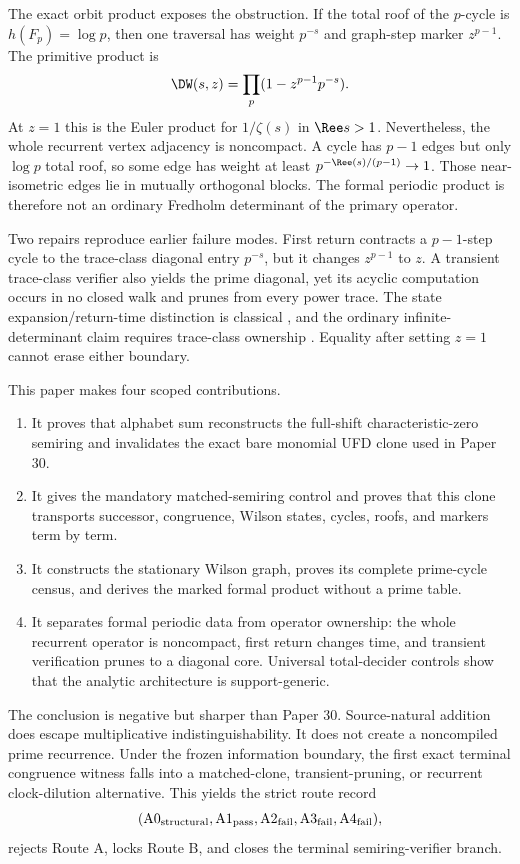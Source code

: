 The exact orbit product exposes the obstruction.  If the total roof of the
$p$-cycle is $h(F_p)=\log p$, then one traversal has weight $p^{-s}$ and
graph-step marker $z^{p-1}$.  The primitive product is
\[
  \DW(s,z)=\prod_p(1-z^{p-1}p^{-s}).
\]
At $z=1$ this is the Euler product for $1/\zeta(s)$ in $\Ree s>1$.
Nevertheless, the whole recurrent vertex adjacency is noncompact.  A cycle
has $p-1$ edges but only $\log p$ total roof, so some edge has weight at least
$p^{-\Ree(s)/(p-1)}\to1$.  Those near-isometric edges lie in mutually
orthogonal blocks.  The formal periodic product is therefore not an ordinary
Fredholm determinant of the primary operator.

Two repairs reproduce earlier failure modes.  First return contracts a
$p-1$-step cycle to the trace-class diagonal entry $p^{-s}$, but it changes
$z^{p-1}$ to $z$.  A transient trace-class verifier also yields the prime
diagonal, yet its acyclic computation occurs in no closed walk and prunes from
every power trace.  The state expansion/return-time distinction is classical
\citep{ParrySullivan1975}, and the ordinary infinite-determinant claim requires
trace-class ownership \citep{Simon1977}.  Equality after setting $z=1$ cannot
erase either boundary.

This paper makes four scoped contributions.

\begin{enumerate}
  \item It proves that alphabet sum reconstructs the full-shift
  characteristic-zero semiring and invalidates the exact bare monomial UFD
  clone used in Paper 30.
  \item It gives the mandatory matched-semiring control and proves that this
  clone transports successor, congruence, Wilson states, cycles, roofs, and
  markers term by term.
  \item It constructs the stationary Wilson graph, proves its complete
  prime-cycle census, and derives the marked formal product without a prime
  table.
  \item It separates formal periodic data from operator ownership: the whole
  recurrent operator is noncompact, first return changes time, and transient
  verification prunes to a diagonal core.  Universal total-decider controls
  show that the analytic architecture is support-generic.
\end{enumerate}



The conclusion is negative but sharper than Paper 30.  Source-natural
addition does escape multiplicative indistinguishability.  It does not create
a noncompiled prime recurrence.  Under the frozen information boundary, the
first exact terminal congruence witness falls into a matched-clone,
transient-pruning, or recurrent clock-dilution alternative.  This yields the
strict route record
\[
 (\mathrm{A0}_{\rm structural},\mathrm{A1}_{\rm pass},
   \mathrm{A2}_{\rm fail},\mathrm{A3}_{\rm fail},
   \mathrm{A4}_{\rm fail}),
\]
rejects Route A, locks Route B, and closes the terminal semiring-verifier
branch.

